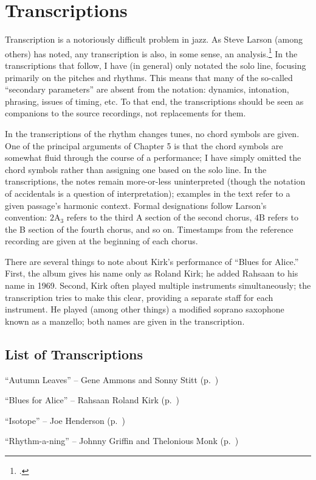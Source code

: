 \doublespacing
\chapter{Transcriptions}
\singlespacing

Transcription is a notoriously difficult problem in jazz. As Steve Larson
(among others) has noted, any transcription is also, in some sense, an
analysis.\footcite[2]{larson:2009} In the transcriptions that follow, I have
(in general) only notated the solo line, focusing primarily on the pitches and
rhythms. This means that many of the so-called ``secondary parameters'' are
absent from the notation: dynamics, intonation, phrasing, issues of timing,
etc. To that end, the transcriptions should be seen as companions to the
source recordings, not replacements for them.

In the transcriptions of the rhythm changes tunes, no chord symbols are given.
One of the principal arguments of Chapter 5 is that the chord symbols are
somewhat fluid through the course of a performance; I have simply omitted the
chord symbols rather than assigning one based on the solo line. In the
transcriptions, the notes remain more-or-less uninterpreted (though the
notation of accidentals is a question of interpretation); examples in the text
refer to a given passage's harmonic context. Formal designations follow
Larson's convention: $2\mathrm{A}_3$ refers to the third A section of the
second chorus, $4\mathrm{B}$ refers to the B section of the fourth chorus, and
so on. Timestamps from the reference recording are given at the beginning of
each chorus.

There are several things to note about Kirk's performance of ``Blues for
Alice.'' First, the album gives his name only as Roland Kirk; he added Rahsaan
to his name in 1969. Second, Kirk often played multiple instruments
simultaneously; the transcription tries to make this clear, providing a
separate staff for each instrument. He played (among other things) a modified
soprano saxophone known as a manzello; both names are given in the
transcription.

\section*{List of Transcriptions}

\begin{compactitem}
    \item ``Autumn Leaves'' -- Gene Ammons and Sonny Stitt
      (p.~\pageref{transcription:autumn-leaves})
    \item ``Blues for Alice'' -- Rahsaan Roland Kirk
      (p.~\pageref{transcription:blues-for-alice})
    \item ``Isotope'' -- Joe Henderson (p.~\pageref{transcription:isotope})
    \item ``Rhythm-a-ning'' -- Johnny Griffin and Thelonious Monk
      (p.~\pageref{transcription:rhythm-a-ning})
\end{compactitem}
\nocite{ammons:stitt,henderson:isotope,monk:action,kirk:freekings}

